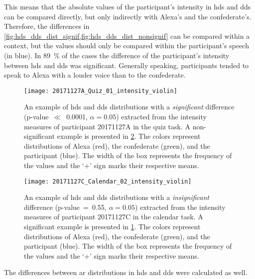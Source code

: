 This means that the absolute values of the participant's intensity in \ac{hds} and \ac{dds} can be compared directly, but only indirectly with Alexa's and the confederate's.
Therefore, the differences in \cref{fig:hds_dds_dist_signif,fig:hds_dds_dist_nonsignif} can be compared within a context, but the values should only be compared within the participant's speech (in blue).
In \SI{89}{\percent} of the cases the difference of the participant's intensity between \ac{hds} and \ac{dds} was significant.
Generally speaking, participants tended to speak to Alexa with a louder voice than to the confederate.
%
\begin{figure}[t]
	\centering
	\texttt{[image: 20171127A\_Quiz\_01\_intensity\_violin]}
	\caption[An interaction with significant \acs{hds} and \acs{dds} intensity distributions difference]
		{An example of \ac{hds} and \ac{dds} distributions with a \emph{significant} difference (p-value~$\ll$~0.0001, $\alpha=0.05$) extracted from the intensity measures of participant 20171127A in the quiz task.
		A non-significant example is presented in \cref{fig:hds_dds_violin_nonsignif}.
		The colors represent distributions of Alexa (red), the confederate (green), and the participant (blue).
		The width of the box represents the frequency of the values and the \enquote*{+} sign marks their respective means.}
	\label{fig:hds_dds_violin_signif}
\end{figure}
%
\begin{figure}
	\texttt{[image: 20171127C\_Calendar\_02\_intensity\_violin]}
	\caption[An interaction with insignificant \acs{hds} and \acs{dds} intensity distributions difference]
		{An example of \ac{hds} and \ac{dds} distributions with a \emph{insignificant} difference (p-value~=~0.55, $\alpha=0.05$) extracted from the intensity measures of participant 20171127C in the calendar task.
		A significant example is presented in \cref{fig:hds_dds_violin_signif}.
		The colors represent distributions of Alexa (red), the confederate (green), and the participant (blue).
		The width of the box represents the frequency of the values and the \enquote*{+} sign marks their respective means.}
	\label{fig:hds_dds_violin_nonsignif}
\end{figure}
%
The differences between \ac{ar} distributions in \ac{hds} and \ac{dds} were calculated as well.

